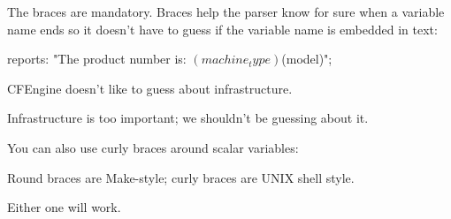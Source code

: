 The braces are mandatory. Braces help the parser know for sure when a
variable name ends so it doesn't have to guess if the variable name is
embedded in text:

\begin{code}
reports:
  "The product number is: $(machine_type)$(model)";
\end{code}

CFEngine doesn't like to guess about infrastructure.

Infrastructure is too important; we shouldn't be guessing about it.





You can also use curly braces around scalar variables:


Round braces are Make-style; curly braces are UNIX shell style.

Either one will work.

